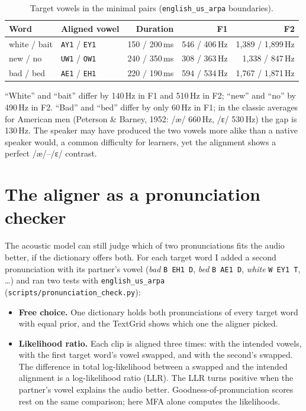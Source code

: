 \documentclass[11pt,a4paper]{article}
\newcommand{\code}[1]{\texttt{#1}}
\begin{document}
\begin{table}[H]\centering\small
\caption{Target vowels in the minimal pairs (\code{english\_us\_arpa} boundaries).}
\label{tab:pairs}
\begin{tabular}{@{}llrrr@{}}
\toprule
Word & Aligned vowel & Duration & F1 & F2 \\
\midrule
white / bait & \code{AY1} / \code{EY1} & 150 / 200\,ms & 546 / 406\,Hz & 1,389 / 1,899\,Hz \\
new / no & \code{UW1} / \code{OW1} & 240 / 350\,ms & 308 / 363\,Hz & 1,338 / 847\,Hz \\
bad / bed & \code{AE1} / \code{EH1} & 220 / 190\,ms & 594 / 534\,Hz & 1,767 / 1,871\,Hz \\
\bottomrule
\end{tabular}
\end{table}

``White'' and ``bait'' differ by 140\,Hz in F1 and 510\,Hz in F2; ``new'' and ``no'' by 490\,Hz in F2. ``Bad'' and
``bed'' differ by only 60\,Hz in F1; in
the classic averages for American men (Peterson \& Barney, 1952: /æ/ 660\,Hz, /ɛ/ 530\,Hz) the gap is 130\,Hz. The
speaker may have produced the two vowels more alike than a native speaker would, a common difficulty for
learners, yet the alignment shows a perfect /æ/--/ɛ/ contrast.

\section{The aligner as a pronunciation checker}
\label{sec:pron}
The acoustic model can still judge which of two pronunciations fits the audio better, if the dictionary offers
both. For each target word I added a second pronunciation with its partner's vowel (\emph{bad} \code{B EH1 D},
\emph{bed} \code{B AE1 D}, \emph{white} \code{W EY1 T}, \ldots) and ran two tests with \code{english\_us\_arpa}
(\code{scripts/pronunciation\_check.py}):
\begin{itemize}
\item \textbf{Free choice.} One dictionary holds both pronunciations of every target word with equal prior, and the
TextGrid shows which one the aligner picked.
\item \textbf{Likelihood ratio.} Each clip is aligned three times: with the intended vowels, with the first target
word's vowel swapped, and with the second's swapped. The difference in total log-likelihood between a swapped and
the intended alignment is a log-likelihood ratio (LLR). The LLR turns positive when the partner's vowel explains
the audio better. Goodness-of-pronunciation scores rest on the same comparison; here MFA alone computes the
likelihoods.
\end{itemize}
\end{document}
